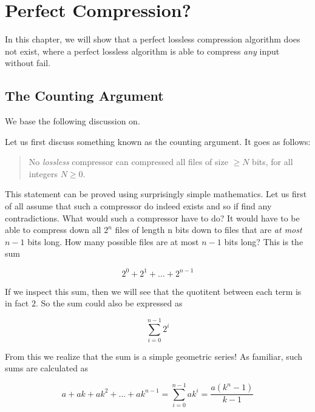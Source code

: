 \begin{comment}
  
\end{comment}

\chapter{Perfect Compression?}
\label{cha:perfect}

In this chapter, we will show that a perfect lossless compression algorithm does
not exist, where a perfect lossless algorithm is able to compress
\textit{any} input without fail.

\section{The Counting Argument}

We base the following discussion on\cite{Salomon:2004:DCC,jean-loup-comp-faq}.

Let us first discuss something known as the counting argument. It goes
as follows:

\begin{quote}
  No \textit{lossless} compressor can compressed all files of size
  $\ge N$ bits, for all integers $N \ge 0$.
\end{quote}

This statement can be proved using surprisingly simple
mathematics. Let us first of all assume that such a compressor do
indeed exists and so if find any contradictions. What would such a
compressor have to do? It would have to be able to compress down all
$2^n$ files of length n bits down to files that are \textit{at most}
$n-1$ bits long. How many possible files are at most $n-1$ bits long?
This is the sum

\begin{equation}
  \label{eq:n-minus-one}
  2^0 + 2^1 + \dots + 2^{n-1}
\end{equation}

If we inspect this sum, then we will see that the quotitent between
each term is in fact $2$. So the sum could also be expressed as

\begin{equation*}
  \sum^{n-1}_{i = 0} 2^{i}
\end{equation*}

From this we realize that the sum is a simple geometric series! As
familiar, such sums are calculated as

\begin{equation}
  \label{eq:geometric-series}
  a + ak + ak^2 + \dots + ak^{n-1} = \sum^{n-1}_{i = 0} ak^{i} =
  \frac{a(k^n - 1)}{k -1}
\end{equation}

